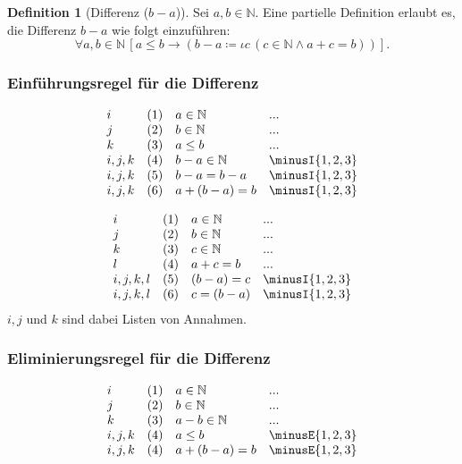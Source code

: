 \documentclass{book}
\theoremstyle{plain}
\theoremstyle{remark}
\theoremstyle{definition}
\newtheorem{definition}{Definition}[section]
\begin{document}
\begin{definition}[Differenz (\( b - a \))]
    Sei \( a, b \in \mathbb{N} \). Eine partielle Definition erlaubt es, die Differenz \( b - a \) wie folgt einzuführen:
    \[
    \forall a, b \in \mathbb{N} \, [ a \leq b \rightarrow ( b - a \coloneqq \iota c \, (c \in \mathbb{N} \land a + c = b) ) ].
    \]
\end{definition}

\subsubsection*{Einführungsregel für die Differenz}
\label{rule:minusI}

\[
\begin{array}{llll}
    i & (1) & a\in\mathbb{N} & ... \\
    j & (2) & b\in\mathbb{N} & ... \\
    k & (3) & a\leq b & ... \\
    i,j,k & (4) & b-a\in\mathbb{N} & \minusI{1,2,3} \\
    i,j,k & (5) & b-a=b-a & \minusI{1,2,3} \\
    i,j,k & (6) & a+(b-a)=b & \minusI{1,2,3} \\
\end{array}
\]

\[
\begin{array}{llll}
    i & (1) & a\in\mathbb{N} & ... \\
    j & (2) & b\in\mathbb{N} & ... \\
    k & (3) & c\in\mathbb{N} & ... \\
    l & (4) & a+c=b & ... \\
    i,j,k,l & (5) & (b-a)=c & \minusI{1,2,3} \\
    i,j,k,l & (6) & c=(b-a) & \minusI{1,2,3} \\
\end{array}
\]
\(i, j\) und \(k\) sind dabei Listen von Annahmen.

\subsubsection*{Eliminierungsregel für die Differenz}
\label{rule:minusE}

\[
\begin{array}{llll}
    i & (1) & a\in\mathbb{N} & ... \\
    j & (2) & b\in\mathbb{N} & ... \\
    k & (3) & a-b\in\mathbb{N} & ... \\
    i,j,k & (4) & a\leq b & \minusE{1,2,3} \\
    i,j,k & (4) & a+(b-a)=b & \minusE{1,2,3} \\
\end{array}
\]
\end{document}
